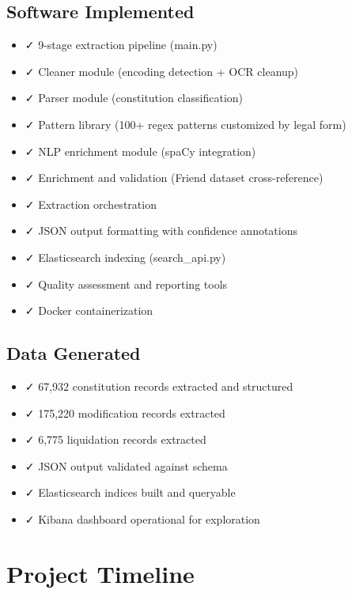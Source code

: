 \documentclass[12pt,a4paper]{report}
\begin{document}
\subsection{Software Implemented}

\begin{itemize}
    \item ✓ 9-stage extraction pipeline (main.py)
    \item ✓ Cleaner module (encoding detection + OCR cleanup)
    \item ✓ Parser module (constitution classification)
    \item ✓ Pattern library (100+ regex patterns customized by legal form)
    \item ✓ NLP enrichment module (spaCy integration)
    \item ✓ Enrichment and validation (Friend dataset cross-reference)
    \item ✓ Extraction orchestration
    \item ✓ JSON output formatting with confidence annotations
    \item ✓ Elasticsearch indexing (search\_api.py)
    \item ✓ Quality assessment and reporting tools
    \item ✓ Docker containerization
\end{itemize}

\subsection{Data Generated}

\begin{itemize}
    \item ✓ 67,932 constitution records extracted and structured
    \item ✓ 175,220 modification records extracted
    \item ✓ 6,775 liquidation records extracted
    \item ✓ JSON output validated against schema
    \item ✓ Elasticsearch indices built and queryable
    \item ✓ Kibana dashboard operational for exploration
\end{itemize}

\section{Project Timeline}
\end{document}
